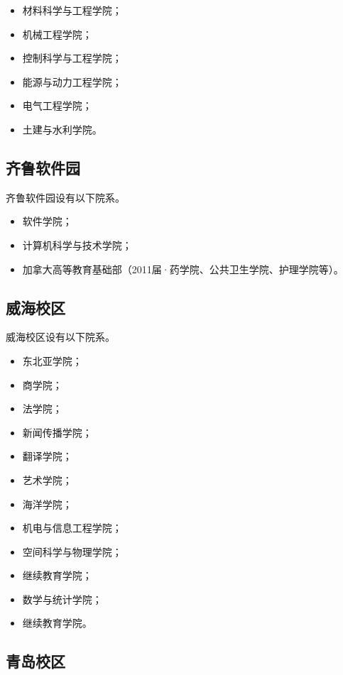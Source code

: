 \documentclass[openany]{sduthesis} %
\begin{document}
\begin{itemize}
  \item 材料科学与工程学院；
  \item 机械工程学院；
  \item 控制科学与工程学院；
  \item 能源与动力工程学院；
  \item 电气工程学院；
  \item 土建与水利学院。
\end{itemize}

\subsection{齐鲁软件园}

齐鲁软件园设有以下院系。

\begin{itemize}
  \item 软件学院；
  \item 计算机科学与技术学院；
  \item 加拿大高等教育基础部（2011届·药学院、公共卫生学院、护理学院等）。
\end{itemize}

\subsection{威海校区}

威海校区设有以下院系。

\begin{itemize}
  \item 东北亚学院；
  \item 商学院；
  \item 法学院；
  \item 新闻传播学院；
  \item 翻译学院；
  \item 艺术学院；
  \item 海洋学院；
  \item 机电与信息工程学院；
  \item 空间科学与物理学院；
  \item 继续教育学院；
  \item 数学与统计学院；
  \item 继续教育学院。
\end{itemize}

\subsection{青岛校区}
\end{document}

